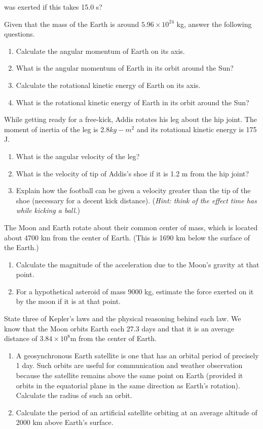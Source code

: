 \documentclass[12pt,addpoints]{exam}
\begin{document}
\begin{questions}
\begin{enumerate}[label=(\roman*)]
			was exerted if this takes 15.0 s?
		\end{enumerate}
		\question Given that the mass of the Earth is around $5.96\times10^{24}$ kg, answer the following questions.
		\begin{enumerate}[label=(\roman*)]
			\item Calculate the angular momentum of Earth on its axis.
			\item What is the angular momentum of Earth in its orbit around the Sun?
			\item Calculate the rotational kinetic energy of Earth on its axis.
			\item What is the rotational kinetic energy of Earth in its orbit around the Sun?
		\end{enumerate}
		\question While getting ready for a free-kick, Addis rotates his leg about the hip joint. The moment of inertia of the leg is 2.8$kg-m^2$ and its rotational kinetic energy is 175 J.
		\begin{enumerate}[label=(\roman*)]
			\item What is the angular velocity of the leg?
			\item What is the velocity of tip of Addis’s shoe if it is 1.2 m from the hip joint?
			\item Explain how the football can be given a velocity greater than the tip of the shoe (necessary for a decent kick
			distance). (\textit{Hint: think of the effect time has while kicking a ball.})
		\end{enumerate}	
		\question The Moon and Earth rotate about their common center of mass, which is located about 4700 km from the center of Earth.
		(This is 1690 km below the surface of the Earth.)
		\begin{enumerate}[label=(\roman*)]
			\item Calculate the magnitude of the acceleration due to the Moon’s gravity at that point.
			\item For a hypothetical asteroid of mass 9000 kg, estimate the force exerted on it by  the moon if it is at that point.
		\end{enumerate}
		\question State three of Kepler's laws and the physical reasoning behind each law.
		\question We know that the Moon orbits Earth each 27.3 days and that it is an average distance of $3.84\times10^{8}$m from the center of Earth. 
		\begin{enumerate}[label=(\roman*)]
			\item A geosynchronous Earth satellite is one that has an orbital period of precisely 1 day. Such orbits are useful for
			communication and weather observation because the satellite remains above the same point on Earth (provided it orbits in the
			equatorial plane in the same direction as Earth’s rotation). Calculate the radius of such an orbit.
			\item Calculate the period of an artificial satellite orbiting at an average altitude of 2000 km above Earth’s surface.
		\end{enumerate}
	\end{questions}		
\end{document}
